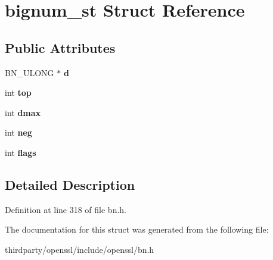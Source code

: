 \hypertarget{structbignum__st}{}\section{bignum\+\_\+st Struct Reference}
\label{structbignum__st}
\subsection*{Public Attributes}
\begin{DoxyCompactItemize}
\item 
\mbox{\label{structbignum__st_afa4e4a2eb24f9c3df7eb33fd589cba31}} 
B\+N\+\_\+\+U\+L\+O\+NG $\ast$ {\bfseries d}
\item 
\mbox{\label{structbignum__st_acb2587e7e0ff144adee978acd5b362f6}} 
int {\bfseries top}
\item 
\mbox{\label{structbignum__st_adc321f2d3b6d3962fda140080275267c}} 
int {\bfseries dmax}
\item 
\mbox{\label{structbignum__st_a4bffe6c6b7a0f7fa9821b0339b7d126f}} 
int {\bfseries neg}
\item 
\mbox{\label{structbignum__st_a7ab1fc90f994e4428dbf1f354cbc82b4}} 
int {\bfseries flags}
\end{DoxyCompactItemize}


\subsection{Detailed Description}


Definition at line 318 of file bn.\+h.



The documentation for this struct was generated from the following file\+:\begin{DoxyCompactItemize}
\item 
thirdparty/openssl/include/openssl/bn.\+h\end{DoxyCompactItemize}
